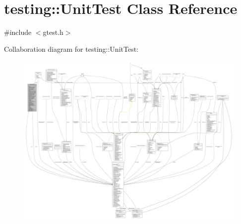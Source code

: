 \hypertarget{classtesting_1_1UnitTest}{}\section{testing\+:\+:Unit\+Test Class Reference}
\label{classtesting_1_1UnitTest}


{\ttfamily \#include $<$gtest.\+h$>$}



Collaboration diagram for testing\+:\+:Unit\+Test\+:
\nopagebreak
\begin{figure}[H]
\begin{center}
\leavevmode
\includegraphics[width=350pt]{classtesting_1_1UnitTest__coll__graph}
\end{center}
\end{figure}
